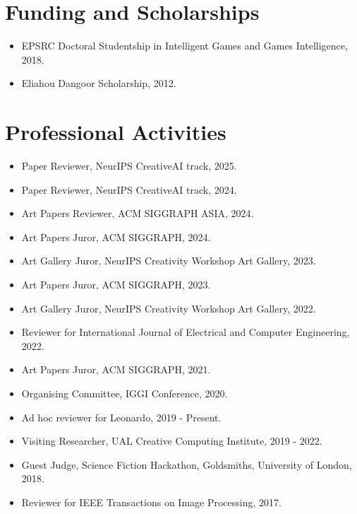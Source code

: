 \documentclass[letterpaper,11pt]{article}
\newcommand{\resumeItem}[2]{
  \item\small{
    \textbf{#1}{ #2 \vspace{-2pt}}
  }
}
\newcommand{\resumeSubItem}[2]{\resumeItem{#1}{#2}\vspace{-4pt}}
\newcommand{\resumeSubHeadingListStart}{\begin{itemize}[leftmargin=*]}
\newcommand{\resumeSubHeadingListEnd}{\end{itemize}}
\begin{document}
\section{Funding and Scholarships}
 \resumeSubHeadingListStart
  \resumeSubItem{}{EPSRC Doctoral Studentship in Intelligent Games and Games Intelligence, 2018.}
  \resumeSubItem{}{Eliahou Dangoor Scholarship, 2012.}
 \resumeSubHeadingListEnd
 

\section{Professional Activities}
 \resumeSubHeadingListStart
 \resumeSubItem{}{Paper Reviewer, NeurIPS CreativeAI track, 2025.}
  \resumeSubItem{}{Paper Reviewer, NeurIPS CreativeAI track, 2024.}
  \resumeSubItem{}{Art Papers Reviewer, ACM SIGGRAPH ASIA, 2024.}
  \resumeSubItem{}{Art Papers Juror, ACM SIGGRAPH, 2024.}
  \resumeSubItem{}{Art Gallery Juror, NeurIPS Creativity Workshop Art Gallery, 2023.}
  \resumeSubItem{}{Art Papers Juror, ACM SIGGRAPH, 2023.}
  \resumeSubItem{}{Art Gallery Juror, NeurIPS Creativity Workshop Art Gallery, 2022.}
  \resumeSubItem{}{Reviewer for International Journal of Electrical and Computer Engineering, 2022.}
  \resumeSubItem{}{Art Papers Juror, ACM SIGGRAPH, 2021.}
  \resumeSubItem{}{Organising Committee, IGGI Conference, 2020.}
\resumeSubItem{}{Ad hoc reviewer for Leonardo, 2019 - Present.}
 \resumeSubItem{}{Visiting Researcher, UAL Creative Computing Institute, 2019 - 2022.}
  \resumeSubItem{}{Guest Judge, Science Fiction Hackathon, Goldsmiths, University of London, 2018.}
  \resumeSubItem{}{Reviewer for IEEE Transactions on Image Processing, 2017.}
 \resumeSubHeadingListEnd

  
\end{document}
